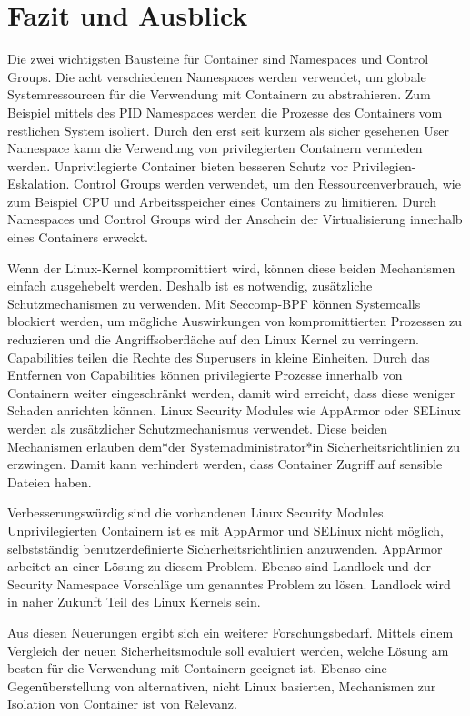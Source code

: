 \chapter{Fazit und Ausblick}
\label{cha:Zusammenfassung}
Die zwei wichtigsten Bausteine für Container sind Namespaces und Control
Groups. Die acht verschiedenen Namespaces werden verwendet, um globale
Systemressourcen für die Verwendung mit Containern zu abstrahieren. Zum
Beispiel mittels des PID Namespaces werden die Prozesse des Containers vom
restlichen System isoliert. Durch den erst seit kurzem als sicher gesehenen
User Namespace kann die Verwendung von privilegierten Containern vermieden
werden. Unprivilegierte Container bieten besseren Schutz vor
Privilegien-Eskalation. Control Groups werden verwendet, um den
Ressourcenverbrauch, wie zum Beispiel CPU und Arbeitsspeicher eines Containers
zu limitieren. Durch Namespaces und Control Groups wird der Anschein der
Virtualisierung innerhalb eines Containers erweckt.

Wenn der Linux-Kernel kompromittiert wird, können diese beiden Mechanismen
einfach ausgehebelt werden. Deshalb ist es notwendig, zusätzliche
Schutzmechanismen zu verwenden. Mit Seccomp-BPF können Systemcalls blockiert
werden, um mögliche Auswirkungen von kompromittierten Prozessen zu reduzieren
und die Angriffsoberfläche auf den Linux Kernel zu verringern.
Capabilities teilen die Rechte des Superusers in kleine Einheiten. Durch das
Entfernen von Capabilities können privilegierte Prozesse innerhalb von
Containern weiter eingeschränkt werden, damit wird erreicht, dass diese weniger
Schaden anrichten können. Linux Security Modules wie AppArmor oder SELinux
werden als zusätzlicher Schutzmechanismus verwendet. Diese beiden Mechanismen
erlauben dem*der Systemadministrator*in Sicherheitsrichtlinien zu erzwingen. Damit
kann verhindert werden, dass Container Zugriff auf sensible Dateien haben.

Verbesserungswürdig sind die vorhandenen Linux Security Modules.
Unprivilegierten Containern ist es mit AppArmor und SELinux nicht möglich,
selbstständig benutzerdefinierte Sicherheitsrichtlinien anzuwenden. AppArmor
arbeitet an einer Lösung zu diesem Problem. Ebenso sind Landlock und der
Security Namespace Vorschläge um genanntes Problem zu lösen. Landlock wird in
naher Zukunft Teil des Linux Kernels sein. 

Aus diesen Neuerungen ergibt sich ein weiterer Forschungsbedarf. Mittels einem
Vergleich der neuen Sicherheitsmodule soll evaluiert werden, welche Lösung am
besten für die Verwendung mit Containern geeignet ist. Ebenso eine
Gegenüberstellung von alternativen, nicht Linux basierten, Mechanismen zur
Isolation von Container ist von Relevanz.
